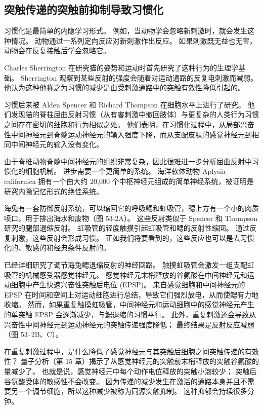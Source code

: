 \subsection{突触传递的突触前抑制导致习惯化}
习惯化是最简单的内隐学习形式。 例如，当动物学会忽略新刺激时，就会发生这种情况。 动物通过一系列定向反应对新刺激作出反应。 如果刺激既无益也无害，动物会在反复接触后学会忽略它。

Charles Sherrington 在研究猫的姿势和运动时首先研究了这种行为的生理学基础。 Sherrington 观察到某些反射的强度会随着对运动通路的反复电刺激而减弱。 他认为这种他称之为习惯的减少是由受刺激通路中的突触有效性降低引起的。

习惯后来被 Alden Spencer 和 Richard Thompson 在细胞水平上进行了研究。 他们发现猫的脊柱屈曲反射习惯（从有害刺激中撤回肢体）与更复杂的人类行为习惯之间存在密切的细胞和行为相似之处。 他们表明，在习惯化过程中，从局部兴奋性中间神经元到脊髓运动神经元的输入强度下降，而从支配皮肤的感觉神经元到相同中间神经元的输入没有变化。

由于脊椎动物脊髓中间神经元的组织非常复杂，因此很难进一步分析屈曲反射中习惯化的细胞机制。 进步需要一个更简单的系统。 海洋软体动物 Aplysia californica 拥有一个由大约 20,000 个中枢神经元组成的简单神经系统，被证明是研究内隐记忆形式的绝佳系统。

海兔有一套防御反射系统，可以缩回它的呼吸鳃和虹吸管，鳃上方有一个小的肉质喷口，用于排出海水和废物（图 53-2A）。 这些反射类似于 Spencer 和 Thompson 研究的腿部退缩反射。 虹吸管的轻度触摸引起虹吸管和鳃的反射性缩回。 通过反复刺激，这些反射会形成习惯。 正如我们将要看到的，这些反应也可以是去习惯化的、敏感的和经典条件反射的。

已经详细研究了调节海兔鳃退缩反射的神经回路。 触摸虹吸管会激发一组支配虹吸管的机械感受器感觉神经元。 感觉神经元末梢释放的谷氨酸在中间神经元和运动细胞中产生快速兴奋性突触后电位 (EPSP)。 来自感觉细胞和中间神经元的 EPSP 在时间和空间上对运动细胞进行总结，导致它们强烈放电，从而使鳃有力地收缩。 然而，如果重复触摸虹吸管，中间神经元和运动细胞中的感觉神经元产生的单突触 EPSP 会逐渐减少，与鳃退缩的习惯平行。 此外，重复刺激还会导致从兴奋性中间神经元到运动神经元的突触传递强度降低； 最终结果是反射反应减弱（图 53–2B、C）。

在重复刺激过程中，是什么降低了感觉神经元与其突触后细胞之间突触传递的有效性？ 量子分析（第 15 章）揭示了从感觉神经元的突触前末梢释放的突触谷氨酸的量减少了。 也就是说，感觉神经元中每个动作电位释放的突触小泡较少； 突触后谷氨酸受体的敏感性不会改变。 因为传递的减少发生在激活的通路本身并且不需要另一个调节细胞，所以这种减少被称为同源突触抑制。 这种抑郁会持续很多分钟。

